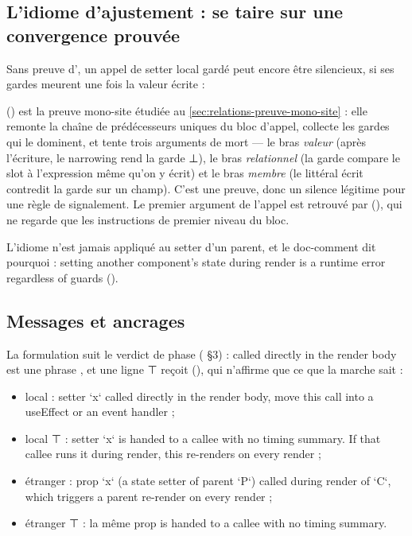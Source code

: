 \subsection{L'idiome d'ajustement : se taire sur une convergence prouvée}

Sans preuve d'\Error, un appel de setter local gardé peut encore être silencieux, si ses gardes meurent une fois la valeur écrite :


 () est la preuve \og mono-site\fg{} étudiée au \cref{sec:relations-preuve-mono-site} : elle remonte la chaîne de prédécesseurs uniques du bloc d'appel, collecte les gardes qui le dominent, et tente trois arguments de mort --- le bras \emph{valeur} (après l'écriture, le narrowing rend la garde ⊥), le bras \emph{relationnel} (la garde compare le slot à l'expression même qu'on y écrit) et le bras \emph{membre} (le littéral écrit contredit la garde sur un champ). C'est une preuve, donc un silence légitime pour une règle de signalement. Le premier argument de l'appel est retrouvé par  (), qui ne regarde que les instructions de premier niveau du bloc.

L'idiome n'est jamais appliqué au setter d'un parent, et le doc-comment dit pourquoi : \og setting another component's state during render is a runtime error regardless of guards\fg{} ().

\subsection{Messages et ancrages}

La formulation suit le verdict de phase ( §3) : \og called directly in the render body\fg{} est une phrase , et une ligne ⊤ reçoit  (), qui n'affirme que ce que la marche sait :

\begin{itemize}
  \item local  : \og setter `x` called directly in the render body, move this call into a useEffect or an event handler\fg{} ;
  \item local ⊤ : \og setter `x` is handed to a callee with no timing summary. If that callee runs it during render, this re-renders on every render\fg{} ;
  \item étranger  : \og prop `x` (a state setter of parent `P`) called during render of `C`, which triggers a parent re-render on every render\fg{} ;
  \item étranger ⊤ : la même prop \og is handed to a callee with no timing summary\fg.
\end{itemize}

